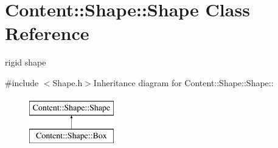 \hypertarget{classContent_1_1Shape_1_1Shape}{
\section{Content::Shape::Shape Class Reference}
\label{classContent_1_1Shape_1_1Shape}
}


rigid shape  


{\ttfamily \#include $<$Shape.h$>$}Inheritance diagram for Content::Shape::Shape::\begin{figure}[H]
\begin{center}
\leavevmode
\includegraphics[height=2cm]{classContent_1_1Shape_1_1Shape}
\end{center}
\end{figure}

